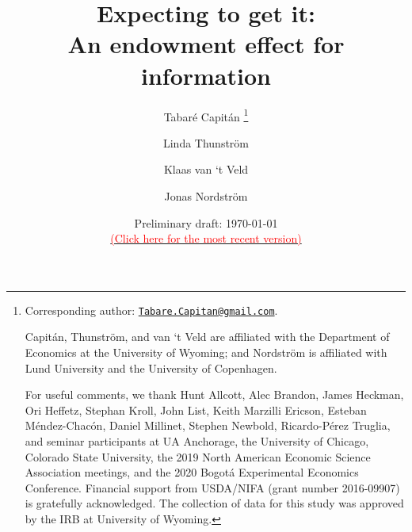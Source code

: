 
\title{\vspace{-2cm}
      Expecting to get it: \\ An endowment effect for information
      }

\author{\small{Tabaré Capitán}
          \thanks{Corresponding author: \href{mailto:Tabare.Capitan@gmail.com}{\texttt{Tabare.Capitan@gmail.com}}.

          
          Capitán, Thunström, and van ‘t Veld are affiliated with the Department of Economics at the University of Wyoming; and Nordström is affiliated with Lund University and the University of Copenhagen.


          For useful comments, we thank Hunt Allcott, Alec Brandon, James Heckman, Ori Heffetz, Stephan Kroll, John List, Keith Marzilli Ericson, Esteban Méndez-Chacón, Daniel Millinet, Stephen Newbold, Ricardo-Pérez Truglia, and seminar participants at UA Anchorage, the University of Chicago, Colorado State University, the 2019 North American Economic Science Association meetings, and the 2020 Bogotá Experimental Economics Conference. Financial support from USDA/NIFA (grant number 2016-09907) is gratefully acknowledged. The collection of data for this study was approved by the IRB at University of Wyoming.}
        \and
        \small{Linda Thunström}
        \and
        \small{Klaas van ‘t Veld}
        \and
        \small{Jonas Nordström}
        }

\date{\vspace{0.5cm} {\small{Preliminary draft: \today}} \\ \href{https://www.tabarecapitan.com/jmp/}{\small{\textcolor{red}{(Click here for the most recent version)}}}}

\maketitle

\thispagestyle{empty}   %

